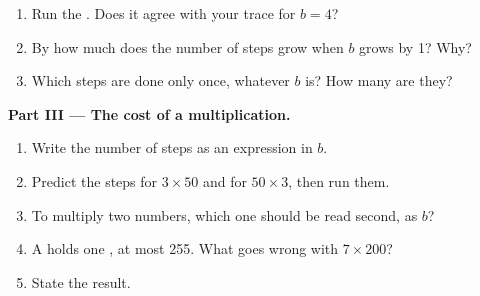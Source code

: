 \begin{problem}
\begin{enumerate}[resume]
  \item Run the . Does it agree with your trace for $b = 4$?
  \item By how much does the number of steps grow when $b$ grows by 1? Why?
  \item Which steps are done only once, whatever $b$ is? How many are they?
\end{enumerate}

\medskip\noindent\textbf{Part III --- The cost of a multiplication.}
\begin{enumerate}[resume]
  \item Write the number of steps as an expression in $b$.
  \item Predict the steps for $3 \times 50$ and for $50 \times 3$, then run
    them.
  \item To multiply two numbers, which one should be read second, as $b$?
  \item A  holds one , at most 255. What goes wrong with
    $7 \times 200$?
  \item State the result.
\end{enumerate}
\end{problem}
